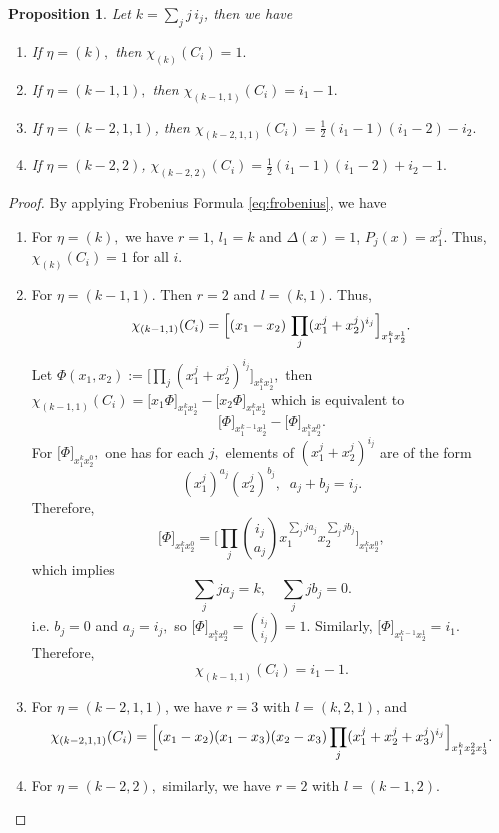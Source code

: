 \documentclass[10pt,a4paper]{amsart}
\newtheorem{proposition}{Proposition}
\begin{document}
\begin{proposition}\label{prop: frobenius} Let $k = \sum_j j\,i_j$, then we have
  \begin{enumerate}
      \item[(a)] If $\eta = (k),$ then $\chi_{(k)}(C_i) = 1.$
      \item[(b)] If $\eta = (k-1,1),$ then $\chi_{(k-1,1)}(C_i) = i_1 - 1.$ 
      \item[(c)] If $\eta= (k-2,1,1)$, then $\chi_{(k-2,1,1)}(C_i)=\frac{1}{2}(i_1-1)(i_1-2) - i_2.$
      \item[(d)] If $\eta = (k-2,2)$,
$\chi_{(k-2,2)}(C_i)
=
\frac{1}{2}(i_1-1)(i_1-2) + i_2 - 1.$
  \end{enumerate}  
\end{proposition}

\begin{proof} By applying Frobenius Formula \eqref{eq:frobenius}, we have
\begin{enumerate}
\item[(a)] For $\eta = (k),$ we have $r=1$, $l_1 = k$ and $\Delta(x)=1$, $P_j(x)=x_1^j$.
Thus, $\chi_{(k)}(C_i) = 1$ for all $i$.
\item[(b)] For $\eta = (k-1,1)$. Then $r=2$ and $l=(k,1).$ Thus,
\[
\chi_{(k-1,1)}(C_i)
=
\Bigl[
(x_1-x_2)\,
\prod_j (x_1^j + x_2^j)^{i_j}
\Bigr]_{x_1^{k}x_2^{1}}.
\]
Let $\Phi(x_1,x_2):=\Bigr[\prod_j (x_1^j + x_2^j)^{i_j}
\Bigr]_{x_1^{k}x_2^{1}},$ then $
\chi_{(k-1,1)}(C_i)=\Bigr[x_1\Phi\Bigr]_{x_1^{k}x_2^{1}}-\Bigr[x_2\Phi\Bigr]_{x_1^{k}x_2^{1}}$ which is equivalent to 
\[
\Bigr[\Phi\Bigr]_{x_1^{k-1}x_2^{1}}-\Bigr[\Phi\Bigr]_{x_1^{k}x_2^{0}}.
\]
For $\Bigr[\Phi\Bigr]_{x_1^{k}x_2^{0}},$ one has for each $j,$ elements of $(x_1^j+x_2^j)^{i_j}$ are of the form 
\[
(x_1^j)^{a_j}(x_2^j)^{b_j},\;\;a_j+b_j=i_j.
\]
Therefore, 
\[
\Bigr[\Phi\Bigr]_{x_1^{k}x_2^{0}}=\Bigr[\prod_{j}\binom{i_j}{a_j}x_1^{\sum_j ja_j}x_2^{\sum_j jb_j}\Bigr]_{x_1^kx_2^0},
\]
which implies
\[
\sum_j ja_j = k,\quad
\sum_j jb_j=0.
\]
i.e. $b_j=0$ and $a_j=i_j,$ so $\Bigr[\Phi\Bigr]_{x_1^{k}x_2^{0}}=\binom{i_j}{i_j}=1.$ Similarly, $\Bigr[\Phi\Bigr]_{x_1^{k-1}x_2^{1}}=i_1.$
Therefore,
\[
\chi_{(k-1,1)}(C_i) = i_1 - 1.
\]
\item[(c)] For $\eta= (k-2,1,1)$, we have $r=3$ with $l = (k,2,1)$, and
\[
\chi_{(k-2,1,1)}(C_i)
=
\Bigl[
(x_1-x_2)(x_1-x_3)(x_2-x_3)
\prod_j (x_1^j + x_2^j + x_3^j)^{i_j}
\Bigr]_{x_1^{k}x_2^{2}x_3^{1}}.
\]
\item[(d)] For $\eta = (k-2,2),$ similarly, we have $r=2$ with $l = (k-1,2)$.
\end{enumerate}
\end{proof}
\end{document}
